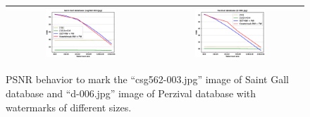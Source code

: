\documentclass[runningheads]{llncs}
\begin{document}
\begin{figure}[H]
	\begin{center}
		\begin{tabular}{|c|c|}\hline
			\includegraphics[width=0.5\textwidth]{PSNRwsizeSaintGall.eps}
			&\includegraphics[width=0.5\textwidth]{PSNRwsizeParzival.eps}\\\hline
		\end{tabular}
	\end{center}
	\caption{PSNR behavior to mark the ``csg562-003.jpg'' image of Saint Gall database and ``d-006.jpg'' image of Perzival database with watermarks of different sizes.}
	\label{psnrwsize}
\end{figure}
\end{document}
